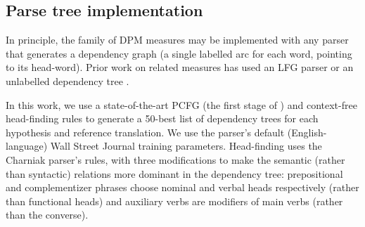 \documentclass{kluwer}    %
\begin{document}
\begin{article}
\subsection{Parse tree implementation}
In principle, the family of DPM measures may be implemented with
any parser that generates a dependency graph (a single labelled arc
for each word, pointing to its head-word). Prior work
\cite{owczarzak07labelleddepseval} on related
measures has used an LFG parser \cite{cahill04lfg} or
an unlabelled dependency tree \cite{liu05syntaxformteval}. 

In this work, we use a state-of-the-art PCFG (the first stage of
) and context-free head-finding
rules \cite{magerman95headfinding} to generate a 50-best list of
dependency trees for each hypothesis and reference translation.  We
use the parser's default (English-language) Wall Street Journal
training parameters.  Head-finding uses the Charniak parser's rules,
with three modifications to make the semantic (rather than syntactic)
relations more dominant in the dependency tree: prepositional and
complementizer phrases choose nominal and verbal heads respectively
(rather than functional heads) and auxiliary verbs are modifiers of
main verbs (rather than the converse).


\end{article}
\end{document}
